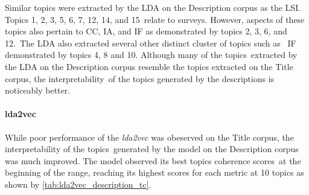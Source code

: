 \documentclass[letterpaper,12pt]{article}
\begin{document}
Similar topics were extracted by the LDA on the Description corpus as the LSI. Topics 1, 2, 3, 5, 6, 7, 12, 14, and 15\
relate to surveys. However, aspects of these topics also pertain to CC, IA, and IF as demonstrated by topics 2, 3, 6, and 12.\
The LDA also extracted several other distinct cluster of topics such as \
IF demonstrated by topics 4, 8 and 10. Although many of the topics\
extracted by the LDA on the Description corpus resemble the topics extracted on the Title corpus, the interpretability\
of the topics generated by the descriptions is noticeably better.

\paragraph{lda2vec}

While poor performance of the \emph{lda2vec} was obeserved on the Title corpus, the interpretability of the topics\
generated by the model on the Description corpus was much improved. The model observed its best topics coherence scores\
at the beginning of the range, reaching its highest scores for each metric at 10 topics as shown by \ref{tab:lda2vec_description_tc}.\
\end{document}
